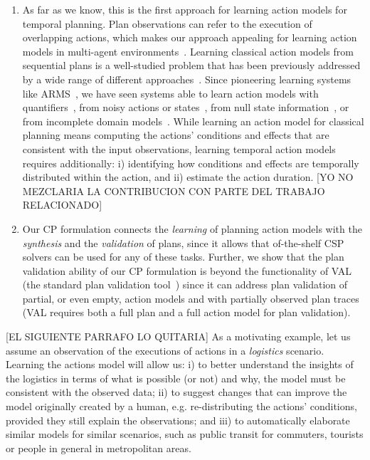 \documentclass{ecai}
\begin{document}
\begin{enumerate}  

\item As far as we know, this is the first approach for learning action models for temporal planning. Plan observations can refer to the execution of overlapping actions, which makes our approach appealing for learning action models in multi-agent environments~\cite{furelos2018carpool}. Learning classical action models from sequential plans is a well-studied problem that has been previously addressed by a wide range of different approaches~\cite{arora2018review}. Since pioneering learning systems like ARMS~\cite{yang2007learning}, we have seen systems able to learn action models with quantifiers~\cite{AmirC08,ZhuoYHL10}, from noisy actions or states~\cite{MouraoZPS12,zhuo2013action}, from null state information~\cite{cresswell2013}, or from incomplete domain models~\cite{ZhuoK17,ZhuoNK13}. While learning an action model for classical planning means computing the actions' conditions and effects that are consistent with the input observations, learning temporal action models requires additionally: i) identifying how conditions and effects are temporally distributed within the action, and ii) estimate the action duration. [YO NO MEZCLARIA LA CONTRIBUCION CON PARTE DEL TRABAJO RELACIONADO]

\item Our CP formulation connects the {\em learning} of planning action models with the {\em synthesis} and the {\em validation} of plans, since it allows that of-the-shelf CSP solvers can be used for any of these tasks. Further, we show that the plan validation ability of our CP formulation is beyond the functionality of VAL (the standard plan validation tool~\cite{howey2004val}) since it can address plan validation of partial, or even empty, action models and with partially observed plan traces (VAL requires both a full plan and a full action model for plan validation). 

\end{enumerate}

[EL SIGUIENTE PARRAFO LO QUITARIA]
As a motivating example, let us assume an observation of the executions of actions in a {\em logistics} scenario. Learning the actions model will allow us: i) to better understand the insights of the logistics in terms of what is possible (or not) and why, the model must be consistent with the observed data; ii) to suggest changes that can improve the model originally created by a human, e.g. re-distributing the actions' conditions, provided they still explain the observations; and iii) to automatically elaborate similar models for similar scenarios, such as public transit for commuters, tourists or people in general in metropolitan areas.
\end{document}
